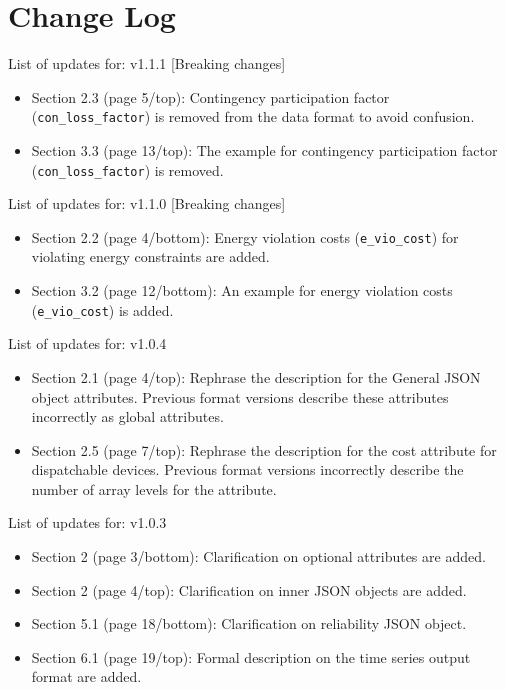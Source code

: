 \documentclass{article}
\begin{document}
\section{Change Log}
List of updates for: v1.1.1 [Breaking changes]
\begin{itemize}
\item Section 2.3 (page 5/top): Contingency participation factor (\texttt{con\_loss\_factor}) is removed from the data format to avoid confusion. 
\item Section 3.3 (page 13/top): The example for contingency participation factor (\texttt{con\_loss\_factor}) is removed.
\end{itemize}
List of updates for: v1.1.0 [Breaking changes] 
\begin{itemize}
\item Section 2.2 (page 4/bottom): Energy violation costs (\texttt{e\_vio\_cost}) for violating energy constraints are added. 
\item Section 3.2 (page 12/bottom): An example for energy violation costs (\texttt{e\_vio\_cost}) is added.
\end{itemize}
List of updates for: v1.0.4
\begin{itemize}
\item Section 2.1 (page 4/top): Rephrase the description for the General JSON object attributes. Previous format versions describe these attributes incorrectly as global attributes.
\item Section 2.5 (page 7/top): Rephrase the description for the cost attribute for dispatchable devices. Previous format versions incorrectly describe the number of array levels for the attribute.
\end{itemize}
List of updates for: v1.0.3
\begin{itemize}
    \item Section 2 (page 3/bottom): Clarification on optional attributes are added.
    \item Section 2 (page 4/top): Clarification on inner JSON objects are added.
    \item Section 5.1 (page 18/bottom): Clarification on reliability JSON object.
    \item Section 6.1 (page 19/top): Formal description on the time series output format are added.
\end{itemize}
\end{document}
